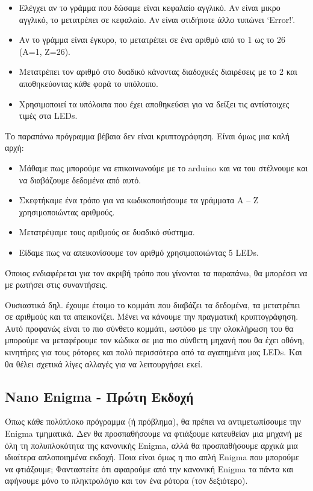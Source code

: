\documentclass[a4paper,twoside,12pt]{article}
\begin{document}
\begin{itemize}
\item Ελέγχει αν το γράμμα που δώσαμε είναι κεφαλαίο αγγλικό. Αν είναι μικρο αγγλικό, το μετατρέπει σε κεφαλαίο. Αν είναι οτιδήποτε άλλο τυπώνει `Error!'.
\item Αν το γράμμα είναι έγκυρο, το μετατρέπει σε ένα αριθμό από το 1 ως το 26 (Α=1, Ζ=26).
\item Μετατρέπει τον αριθμό στο δυαδικό κάνοντας διαδοχικές διαιρέσεις με το 2 και αποθηκεύοντας κάθε φορά το υπόλοιπο.
\item Χρησιμοποιεί τα υπόλοιπα που έχει αποθηκεύσει για να δείξει τις αντίστοιχες τιμές στα LEDs.
\end{itemize}

Το παραπάνω πρόγραμμα βέβαια δεν είναι κρυπτογράφηση. Είναι όμως μια καλή αρχή:

\begin{itemize}
\item Μάθαμε πως μπορούμε να επικοινωνούμε με το arduino και να του στέλνουμε και να διαβάζουμε δεδομένα από αυτό.
\item Σκεφτήκαμε ένα τρόπο για να κωδικοποιήσουμε τα γράμματα A -- Z χρησιμοποιώντας αριθμούς.
\item Μετατρέψαμε τους αριθμούς σε δυαδικό σύστημα.
\item Είδαμε πως να απεικονίσουμε τον αριθμό χρησιμοποιώντας 5 LEDs.
\end{itemize}

Όποιος ενδιαφέρεται για τον ακριβή τρόπο που γίνονται τα παραπάνω, θα μπορέσει να με ρωτήσει στις συναντήσεις.

Ουσιαστικά δηλ. έχουμε έτοιμο το κομμάτι που διαβάζει τα δεδομένα, τα μετατρέπει σε αριθμούς και τα απεικονίζει. Μένει να κάνουμε την πραγματική κρυπτογράφηση. Αυτό προφανώς είναι το πιο σύνθετο κομμάτι, ωστόσο με την ολοκλήρωση του θα μπορούμε να μεταφέρουμε τον κώδικα σε μια πιο σύνθετη μηχανή που θα έχει οθόνη, κινητήρες για τους ρότορες και πολύ περισσότερα από τα αγαπημένα μας LEDs. Και θα θέλει σχετικά λίγες αλλαγές για να λειτουργήσει εκεί.

\subsection{Nano Enigma - Πρώτη Εκδοχή}

Όπως κάθε πολύπλοκο πρόγραμμα (ή πρόβλημα), θα πρέπει να αντιμετωπίσουμε την Enigma τμηματικά. Δεν θα προσπαθήσουμε να φτιάξουμε κατευθείαν μια μηχανή με όλη τη πολυπλοκότητα της κανονικής Enigma, αλλά θα προσπαθήσουμε αρχικά μια ιδιαίτερα απλοποιημένα εκδοχή. Ποια είναι όμως η πιο απλή Enigma που μπορούμε να φτιάξουμε; Φανταστείτε ότι αφαιρούμε από την κανονική Enigma τα πάντα και αφήνουμε μόνο το πληκτρολόγιο και τον ένα ρότορα (τον δεξιότερο).
\end{document}
